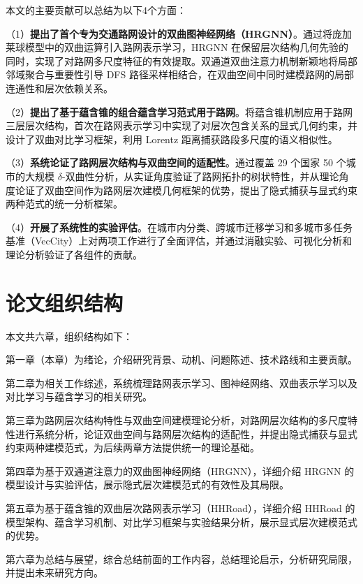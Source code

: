 本文的主要贡献可以总结为以下4个方面：

（1）\textbf{提出了首个专为交通路网设计的双曲图神经网络（HRGNN）}。通过将庞加莱球模型中的双曲运算引入路网表示学习，HRGNN 在保留层次结构几何先验的同时，实现了对路网多尺度特征的有效提取。双通道双曲注意力机制新颖地将局部邻域聚合与重要性引导 DFS 路径采样相结合，在双曲空间中同时建模路网的局部连通性和层次依赖关系。

（2）\textbf{提出了基于蕴含锥的组合蕴含学习范式用于路网}。将蕴含锥机制应用于路网三层层次结构，首次在路网表示学习中实现了对层次包含关系的显式几何约束，并设计了双曲对比学习框架，利用 Lorentz 距离捕获路段多尺度的语义相似性。

（3）\textbf{系统论证了路网层次结构与双曲空间的适配性}。通过覆盖 29 个国家 50 个城市的大规模 $\delta$-双曲性分析，从实证角度验证了路网拓扑的树状特性，并从理论角度论证了双曲空间作为路网层次建模几何框架的优势，提出了隐式捕获与显式约束两种范式的统一分析框架。

（4）\textbf{开展了系统性的实验评估}。在城市内分类、跨城市迁移学习和多城市多任务基准（VecCity）上对两项工作进行了全面评估，并通过消融实验、可视化分析和理论分析验证了各组件的贡献。

\section{论文组织结构}

本文共六章，组织结构如下：

第一章（本章）为绪论，介绍研究背景、动机、问题陈述、技术路线和主要贡献。

第二章为相关工作综述，系统梳理路网表示学习、图神经网络、双曲表示学习以及对比学习与蕴含学习的相关研究。

第三章为路网层次结构特性与双曲空间建模理论分析，对路网层次结构的多尺度特性进行系统分析，论证双曲空间与路网层次结构的适配性，并提出隐式捕获与显式约束两种建模范式，为后续两章方法提供统一的理论基础。

第四章为基于双通道注意力的双曲图神经网络（HRGNN），详细介绍 HRGNN 的模型设计与实验评估，展示隐式层次建模范式的有效性及其局限。

第五章为基于蕴含锥的双曲层次路网表示学习（HHRoad），详细介绍 HHRoad 的模型架构、蕴含学习机制、对比学习框架与实验结果分析，展示显式层次建模范式的优势。

第六章为总结与展望，综合总结前面的工作内容，总结理论启示，分析研究局限，并提出未来研究方向。